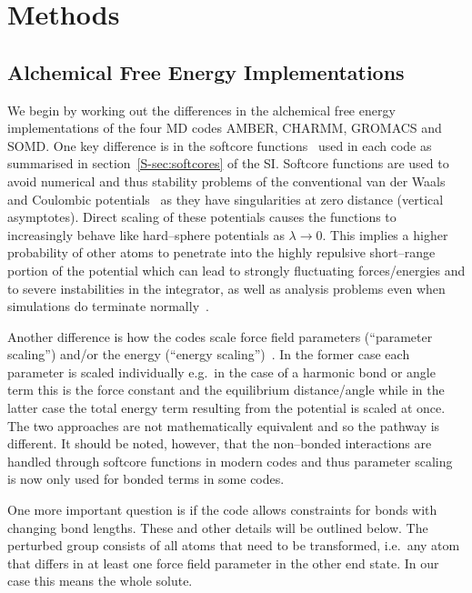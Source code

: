 \documentclass[journal=jctcce,manuscript=article]{achemso}
\begin{document}
\section{Methods}
\label{sec:methods}

\subsection{Alchemical Free Energy Implementations}
\label{sec:afe_impl}

We begin by working out the differences in the alchemical free energy
implementations of the four MD codes AMBER, CHARMM, GROMACS and
SOMD.  One key difference is in the softcore
functions~\cite{beutler_avoiding_1994, zacharias_separationshifted_1994} used 
in each code as summarised in section~\ref{S-sec:softcores} of the SI.  
Softcore functions are used to avoid numerical and thus
stability problems of the conventional van der Waals and Coulombic
potentials~\cite{steinbrecher_nonlinear_2007} as they have
singularities at zero distance (vertical asymptotes).  Direct scaling
of these potentials causes the functions to increasingly behave like
hard--sphere potentials as $\lambda\rightarrow 0$.  This implies a
higher probability of other atoms to penetrate into the highly
repulsive short--range portion of the potential which can lead to
strongly fluctuating forces/energies and to severe instabilities in
the integrator, as well as analysis problems even when simulations do terminate 
normally~\cite{beutler_avoiding_1994, zacharias_separationshifted_1994, 
steinbrecher_nonlinear_2007}.

Another difference is how the codes scale force field parameters (``parameter 
scaling'') and/or the energy (``energy 
scaling'')~\cite{doi:10.1021/jp981628n}.  In the former case each parameter is 
scaled individually e.g.\ in the case of a harmonic bond or angle term
this is the force constant and the equilibrium distance/angle while in the 
latter case the total energy term resulting from the potential is scaled at 
once.  The two approaches are not mathematically equivalent and so the pathway 
is different.  It should be noted, however, that the non--bonded interactions 
are handled through softcore functions in modern codes and thus parameter 
scaling~\cite{doi:10.1021/j100056a020, JCROSS1986198} is now only used for 
bonded terms in some codes.

One more important question is if the code allows constraints for bonds with 
changing bond lengths.  These and other details will be outlined below.  The 
perturbed group consists of all atoms that need to be transformed, i.e.\ any 
atom that differs in at least one force field parameter in the other end
state.  In our case this means the whole solute.%
\end{document}
